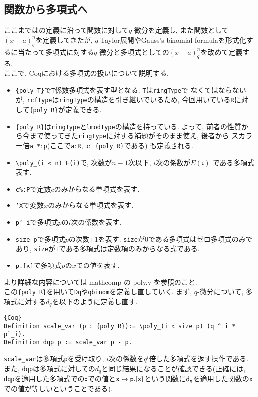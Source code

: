 \documentclass[11pt]{jsreport}
\theoremstyle{mystyle}
\newcommand{\0}{\textbf{0}}
\newcommand{\1}{\textbf{1}}
\newcommand{\2}{\textbf{2}}
\begin{document}
\subsection{関数から多項式へ} \label{ssec poly}
ここまでは\cite{Kac}の定義に沿って関数に対して$q$-微分を定義し, また関数として
$(x - a)^n_q$を定義してきたが, $q$-Taylor展開やGauss's binomial formulaを形式化するに当たって多項式に対する$q$-微分と多項式としての$(x - a)^n_q$を改めて定義する. \\
ここで, Coqにおける多項式の扱いについて説明する. 
\begin{itemize}
  \item {\tt \{poly T\}}で{\tt T}係数多項式を表す型となる. {\tt T}は{\tt ringType}で
    なくてはならないが, {\tt rcfType}は{\tt ringType}の構造を引き継いでいるため, 
    今回用いている{\tt R}に対して{\tt \{poly R\}}が定義できる. 
  \item {\tt \{poly R\}}は{\tt ringType}と{\tt lmodType}の構造を持っている. 
    よって, 前者の性質から今まで使ってきた{\tt ringType}に対する補題がそのまま使え, 後者から
    スカラー倍{\tt a *$\colon$p}(ここで{\tt a$\colon$R}, {\tt p$\colon$ \{poly R\}}である)
    も定義される. 
  \item {\tt \textbackslash poly\_(i < n) E(i)}で, 次数が$n - 1$次以下, $i$次の係数が$E(i)$
    である多項式表す. 
  \item {\tt c\%:P}で定数$c$のみからなる単項式を表す. 
  \item {\tt 'X}で変数$x$のみからなる単項式を表す. 
  \item {\tt p`\_i}で多項式$p$の$i$次の係数を表す. 
  \item {\tt size p}で多項式$p$の次数$+1$を表す. 
    {\tt size}が$0$である多項式はゼロ多項式のみであり, 
    {\tt size}が$1$である多項式は定数項のみからなる式である. 
  \item {\tt p.[x]}で多項式$p$の$x$での値を表す. 
\end{itemize}
より詳細な内容については mathcomp の poly.v を参照のこと. \\
この{\tt \{poly R\}}を用いて{\tt Dq}や{\tt qbinom}を定義し直していく. 
まず, $q$-微分について, 多項式に対する$d_q$を以下のように定義し直す. 
\begin{lstlisting}{Coq}
Definition scale_var (p : {poly R}):= \poly_(i < size p) (q ^ i * p`_i).
Definition dqp p := scale_var p - p. \end{lstlisting}
{\tt scale\_var}は多項式{\tt p}を受け取り, $i$次の係数を$q^i$倍した多項式を返す操作である. また, {\tt dqp}は多項式に対しての$d_q$と同じ結果になることが確認できる(正確には, {\tt dqp}を適用した多項式での{\tt x}での値と${\tt x} \mapsto {\tt p.[x]}$という関数に${\tt d}_{\tt q}$を適用した関数の{\tt x}での値が等しいということである). 
\end{document}
